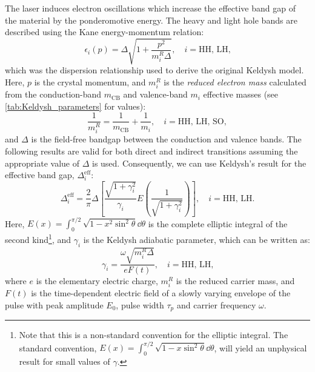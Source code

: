 The laser induces electron oscillations which increase the effective band gap of the material by the ponderomotive energy. The heavy and light hole bands are described using the Kane energy-momentum relation:
\begin{equation}
\epsilon_i(p) = \Delta \sqrt{1+\frac{p^2}{m_i^R \Delta}}, \quad i = \textrm{HH, LH,}
\end{equation}
which was the dispersion relationship used to derive the original Keldysh model. Here, $p$ is the crystal momentum, and $m_i^R$ is the \textit{reduced electron mass} calculated from the conduction-band $m_{\textrm{CB}}$ and valence-band $m_i$ effective masses (see \cref{tab:Keldysh_parameters} for values):
\begin{equation}
\frac{1}{m_i^R} = \frac{1}{m_{\textrm{CB}}} + \frac{1}{m_i}, \quad i = \textrm{HH, LH, SO},
\label{eqn:reduced_electron_mass}
\end{equation}
and $\Delta$ is the field-free bandgap between the conduction and valence bands. The following results are valid for both direct and indirect transitions assuming the appropriate value of $\Delta$ is used. Consequently, we can use Keldysh's result for the effective band gap, $\Delta_i^{\textrm{eff}}$:
\begin{equation}
\Delta_i^{\textrm{eff}} = \frac{2}{\pi} \Delta \left[ \frac{\sqrt{1+\gamma_i^2}}{\gamma_i} E\left(\frac{1}{\sqrt{1+\gamma_i^2}}\right) \right], \quad i = \textrm{HH, LH.}
\label{eqn:eff_bandgap_HHLL}
\end{equation}
Here, $E(x) = \int_{0}^{\pi/2} \sqrt{1 - x^2 \sin^2 \theta} \dd{\theta}$ is the complete elliptic integral of the second kind\footnote{Note that this is a non-standard convention for the elliptic integral. The standard convention, ${E(x) = \int_{0}^{\pi/2} \sqrt{1 - x \sin^2 \theta} \dd{\theta}}$, will yield an unphysical result for small values of $\gamma$.}, and $\gamma_i$ is the Keldysh adiabatic parameter, which can be written as:
\begin{equation}
\label{eqn:gamma_HH_LH}
\gamma_i = \frac{\omega \sqrt{m_i^R \Delta}}{e F(t)}, \quad i = \textrm{HH, LH,}
\end{equation}
where $e$ is the elementary electric charge, $m_i^R$ is the reduced carrier mass, and $F(t)$ is the time-dependent electric field of a slowly varying envelope of the pulse with peak amplitude $E_0$, pulse width $\tau_p$ and carrier frequency $\omega$.

